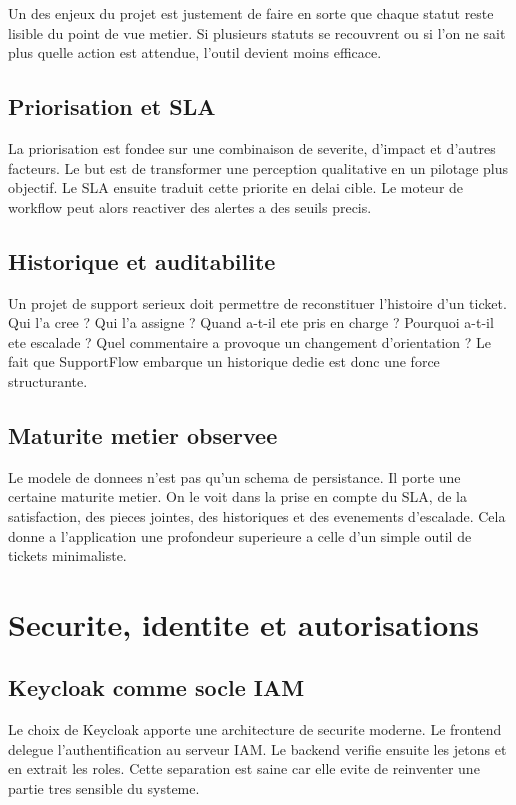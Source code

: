 \documentclass[12pt,a4paper,oneside]{report}
\begin{document}
Un des enjeux du projet est justement de faire en sorte que chaque statut reste lisible du point de vue metier. Si plusieurs statuts se recouvrent ou si l'on ne sait plus quelle action est attendue, l'outil devient moins efficace.

\section{Priorisation et SLA}

La priorisation est fondee sur une combinaison de severite, d'impact et d'autres facteurs. Le but est de transformer une perception qualitative en un pilotage plus objectif. Le SLA ensuite traduit cette priorite en delai cible. Le moteur de workflow peut alors reactiver des alertes a des seuils precis.

\section{Historique et auditabilite}

Un projet de support serieux doit permettre de reconstituer l'histoire d'un ticket. Qui l'a cree ? Qui l'a assigne ? Quand a-t-il ete pris en charge ? Pourquoi a-t-il ete escalade ? Quel commentaire a provoque un changement d'orientation ? Le fait que SupportFlow embarque un historique dedie est donc une force structurante.

\section{Maturite metier observee}

Le modele de donnees n'est pas qu'un schema de persistance. Il porte une certaine maturite metier. On le voit dans la prise en compte du SLA, de la satisfaction, des pieces jointes, des historiques et des evenements d'escalade. Cela donne a l'application une profondeur superieure a celle d'un simple outil de tickets minimaliste.

\chapter{Securite, identite et autorisations}

\section{Keycloak comme socle IAM}

Le choix de Keycloak apporte une architecture de securite moderne. Le frontend delegue l'authentification au serveur IAM. Le backend verifie ensuite les jetons et en extrait les roles. Cette separation est saine car elle evite de reinventer une partie tres sensible du systeme.
\end{document}
